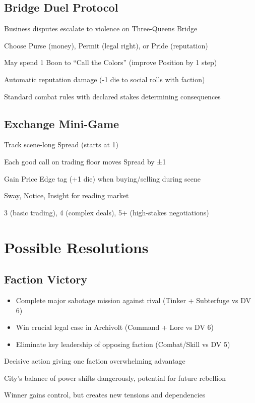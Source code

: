 \documentclass[11pt]{article}
\newenvironment{mechanics}{\begin{description}[leftmargin=*,style=standard]}{\end{description}}
\newenvironment{resolution}[1]{\begin{description}[leftmargin=*,style=standard]\item[\textbf{#1}]}{\end{description}}
\begin{document}
\subsection{Bridge Duel Protocol}
\begin{mechanics}
\item[Trigger:] Business disputes escalate to violence on Three-Queens Bridge
\item[Stakes Declaration:] Choose Purse (money), Permit (legal right), or Pride (reputation)
\item[Seconds:] May spend 1 Boon to ``Call the Colors'' (improve Position by 1 step)
\item[Refusal Consequences:] Automatic reputation damage (-1 die to social rolls with faction)
\item[Resolution:] Standard combat rules with declared stakes determining consequences
\end{mechanics}

\subsection{Exchange Mini-Game}
\begin{mechanics}
\item[Setup:] Track scene-long Spread (starts at 1)
\item[Actions:] Each good call on trading floor moves Spread by ±1
\item[Cash Out:] Gain Price Edge tag (+1 die) when buying/selling during scene
\item[Skills Used:] Sway, Notice, Insight for reading market
\item[DV:] 3 (basic trading), 4 (complex deals), 5+ (high-stakes negotiations)
\end{mechanics}

\section{Possible Resolutions}

\subsection{Faction Victory}
\begin{resolution}{Faction Victory}
\item[Requirements:] 
  \begin{itemize}
    \item Complete major sabotage mission against rival (Tinker + Subterfuge vs DV 6)
    \item Win crucial legal case in Archivolt (Command + Lore vs DV 6)
    \item Eliminate key leadership of opposing faction (Combat/Skill vs DV 5)
  \end{itemize}
\item[Procedure:] Decisive action giving one faction overwhelming advantage
\item[Costs:] City's balance of power shifts dangerously, potential for future rebellion
\item[Outcome:] Winner gains control, but creates new tensions and dependencies
\end{resolution}
\end{document}
